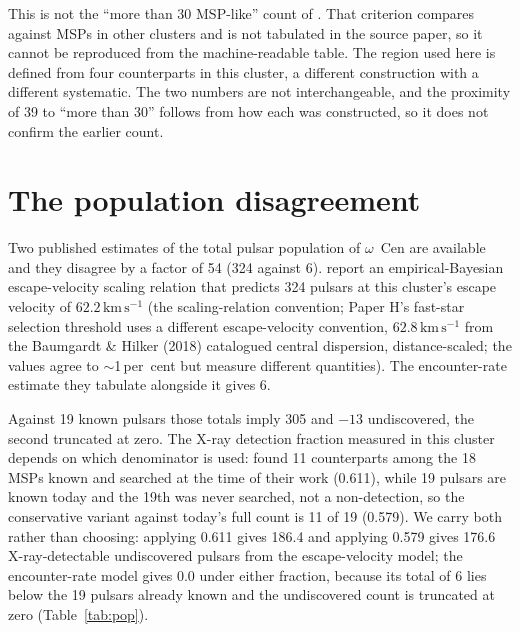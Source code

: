 \documentclass[11pt]{article}
\newcommand{\ocen}{$\omega$~Cen}
\begin{document}
This is not the ``more than 30 MSP-like'' count of \citet{Henleywillis2018}. That criterion compares against MSPs in other clusters and is not tabulated in the source paper, so it cannot be reproduced from the machine-readable table. The region used here is defined from four counterparts in this cluster, a different construction with a different systematic. The two numbers are not interchangeable, and the proximity of 39 to ``more than 30'' follows from how each was constructed, so it does not confirm the earlier count.

\section{The population disagreement}
\label{sec:tension}

Two published estimates of the total pulsar population of \ocen{} are available and they disagree by a factor of 54 (324 against 6). \citet{Yin2024} report an empirical-Bayesian escape-velocity scaling relation that predicts 324 pulsars at this cluster's escape velocity of $62.2\,\mathrm{km\,s^{-1}}$ (the \citealt{Yin2024} scaling-relation convention; Paper H's fast-star selection threshold uses a different escape-velocity convention, $62.8\,\mathrm{km\,s^{-1}}$ from the Baumgardt \& Hilker (2018) catalogued central dispersion, distance-scaled; the values agree to $\sim$1\,per~cent but measure different quantities). The encounter-rate estimate they tabulate alongside it gives 6.

Against 19 known pulsars those totals imply 305 and $-13$ undiscovered, the second truncated at zero. The X-ray detection fraction measured in this cluster depends on which denominator is used: \citet{ZhaoHeinke2023} found 11 counterparts among the 18 MSPs known and searched at the time of their work (0.611), while 19 pulsars are known today and the 19th was never searched, not a non-detection, so the conservative variant against today's full count is 11 of 19 (0.579). We carry both rather than choosing: applying 0.611 gives 186.4 and applying 0.579 gives 176.6 X-ray-detectable undiscovered pulsars from the escape-velocity model; the encounter-rate model gives 0.0 under either fraction, because its total of 6 lies below the 19 pulsars already known and the undiscovered count is truncated at zero (Table~\ref{tab:pop}).
\end{document}
